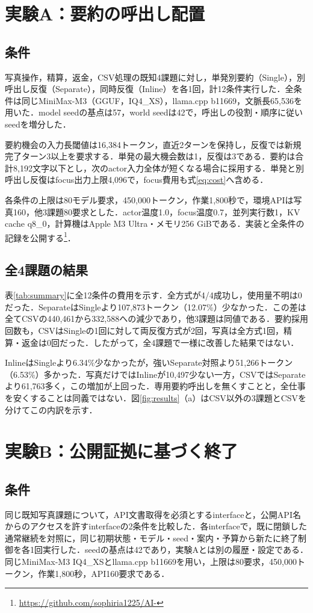 \documentclass[letter]{ieicej}
\begin{document}
\section{実験A：要約の呼出し配置}
\subsection{条件}
写真操作，精算，返金，CSV処理の既知4課題に対し，単発別要約（Single），別呼出し反復（Separate），同時反復（Inline）を各1回，計12条件実行した．全条件は同じMiniMax-M3（GGUF，IQ4\_XS），llama.cpp b11669，文脈長65,536を用いた．model seedの基点は57，world seedは42で，呼出しの役割・順序に従いseedを増分した．

要約機会の入力長閾値は16,384トークン，直近2ターンを保持し，反復では新規完了ターン3以上を要求する．単発の最大機会数は1，反復は3である．要約は合計8,192文字以下とし，次のactor入力全体が短くなる場合に採用する．単発と別呼出し反復はfocus出力上限4,096で，focus費用も式\eqref{eq:cost}へ含める．

各条件の上限は80モデル要求，450,000トークン，作業1,800秒で，環境APIは写真160，他3課題80要求とした．actor温度1.0，focus温度0.7，並列実行数1，KV cache q8\_0，計算機はApple M3 Ultra・メモリ256 GiBである．実装と全条件の記録を公開する\footnote{\url{https://github.com/sophiria1225/AI-}}．

\subsection{全4課題の結果}
表\ref{tab:summary}に全12条件の費用を示す．全方式が4/4成功し，使用量不明は0だった．SeparateはSingleより107,873トークン（12.07\%）少なかった．この差は全てCSVの440,461から332,588への減少であり，他3課題は同値である．要約採用回数も，CSVはSingleの1回に対して両反復方式が2回，写真は全方式1回，精算・返金は0回だった．したがって，全4課題で一様に改善した結果ではない．

InlineはSingleより6.34\%少なかったが，強いSeparate対照より51,266トークン（6.53\%）多かった．写真だけではInlineが10,497少ない一方，CSVではSeparateより61,763多く，この増加が上回った．専用要約呼出しを無くすことと，全仕事を安くすることは同義ではない．図\ref{fig:results}（a）はCSV以外の3課題とCSVを分けてこの内訳を示す．



\section{実験B：公開証拠に基づく終了}
\subsection{条件}
同じ既知写真課題について，API文書取得を必須とするinterfaceと，公開API名からのアクセスを許すinterfaceの2条件を比較した．各interfaceで，既に閉鎖した通常継続を対照に，同じ初期状態・モデル・seed・案内・予算から新たに終了制御を各1回実行した．seedの基点は42であり，実験Aとは別の履歴・設定である．同じMiniMax-M3 IQ4\_XSとllama.cpp b11669を用い，上限は80要求，450,000トークン，作業1,800秒，API160要求である．
\end{document}
